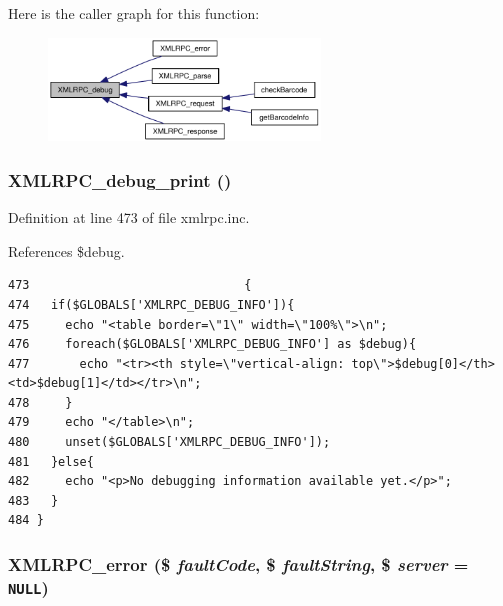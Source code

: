 Here is the caller graph for this function:\nopagebreak
\begin{figure}[H]
\begin{center}
\leavevmode
\includegraphics[width=205pt]{xmlrpc_8inc_e2d2e97a8c1c560f5e96d58d60a02874_icgraph}
\end{center}
\end{figure}
\hypertarget{xmlrpc_8inc_8467f85edd385ddf2506b1bd5065a6d7}{
\subsubsection{\setlength{\rightskip}{0pt plus 5cm}XMLRPC\_\-debug\_\-print ()}}
\label{xmlrpc_8inc_8467f85edd385ddf2506b1bd5065a6d7}




Definition at line 473 of file xmlrpc.inc.

References \$debug.

\begin{Code}\begin{verbatim}473                              {
474   if($GLOBALS['XMLRPC_DEBUG_INFO']){
475     echo "<table border=\"1\" width=\"100%\">\n";
476     foreach($GLOBALS['XMLRPC_DEBUG_INFO'] as $debug){
477       echo "<tr><th style=\"vertical-align: top\">$debug[0]</th><td>$debug[1]</td></tr>\n";
478     }
479     echo "</table>\n";
480     unset($GLOBALS['XMLRPC_DEBUG_INFO']);
481   }else{
482     echo "<p>No debugging information available yet.</p>";
483   }
484 }
\end{verbatim}
\end{Code}


\hypertarget{xmlrpc_8inc_0cdc54b1376ccbbe412175c9819a95ac}{
\subsubsection{\setlength{\rightskip}{0pt plus 5cm}XMLRPC\_\-error (\$ {\em faultCode}, \$ {\em faultString}, \$ {\em server} = {\tt NULL})}}
\label{xmlrpc_8inc_0cdc54b1376ccbbe412175c9819a95ac}




